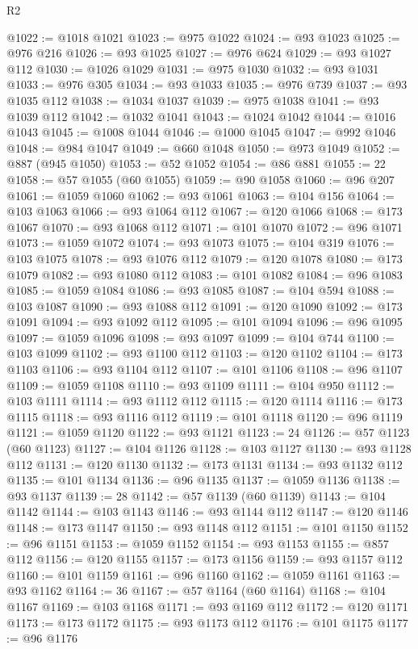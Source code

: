 \begin{lexlean}{R2}
\begin{coremodule}
@1022 := @1018 @1021
@1023 := @975 @1022
@1024 := @93 @1023
@1025 := @976 @216
@1026 := @93 @1025
@1027 := @976 @624
@1029 := @93 @1027 @112
@1030 := @1026 @1029
@1031 := @975 @1030
@1032 := @93 @1031
@1033 := @976 @305
@1034 := @93 @1033
@1035 := @976 @739
@1037 := @93 @1035 @112
@1038 := @1034 @1037
@1039 := @975 @1038
@1041 := @93 @1039 @112
@1042 := @1032 @1041
@1043 := @1024 @1042
@1044 := @1016 @1043
@1045 := @1008 @1044
@1046 := @1000 @1045
@1047 := @992 @1046
@1048 := @984 @1047
@1049 := @660 @1048
@1050 := @973 @1049
@1052 := @887 (@945 @1050)
@1053 := @52 @1052
@1054 := @86 @881
@1055 := 22
@1058 := @57 @1055 (@60 @1055)
@1059 := @90 @1058
@1060 := @96 @207
@1061 := @1059 @1060
@1062 := @93 @1061
@1063 := @104 @156
@1064 := @103 @1063
@1066 := @93 @1064 @112
@1067 := @120 @1066
@1068 := @173 @1067
@1070 := @93 @1068 @112
@1071 := @101 @1070
@1072 := @96 @1071
@1073 := @1059 @1072
@1074 := @93 @1073
@1075 := @104 @319
@1076 := @103 @1075
@1078 := @93 @1076 @112
@1079 := @120 @1078
@1080 := @173 @1079
@1082 := @93 @1080 @112
@1083 := @101 @1082
@1084 := @96 @1083
@1085 := @1059 @1084
@1086 := @93 @1085
@1087 := @104 @594
@1088 := @103 @1087
@1090 := @93 @1088 @112
@1091 := @120 @1090
@1092 := @173 @1091
@1094 := @93 @1092 @112
@1095 := @101 @1094
@1096 := @96 @1095
@1097 := @1059 @1096
@1098 := @93 @1097
@1099 := @104 @744
@1100 := @103 @1099
@1102 := @93 @1100 @112
@1103 := @120 @1102
@1104 := @173 @1103
@1106 := @93 @1104 @112
@1107 := @101 @1106
@1108 := @96 @1107
@1109 := @1059 @1108
@1110 := @93 @1109
@1111 := @104 @950
@1112 := @103 @1111
@1114 := @93 @1112 @112
@1115 := @120 @1114
@1116 := @173 @1115
@1118 := @93 @1116 @112
@1119 := @101 @1118
@1120 := @96 @1119
@1121 := @1059 @1120
@1122 := @93 @1121
@1123 := 24
@1126 := @57 @1123 (@60 @1123)
@1127 := @104 @1126
@1128 := @103 @1127
@1130 := @93 @1128 @112
@1131 := @120 @1130
@1132 := @173 @1131
@1134 := @93 @1132 @112
@1135 := @101 @1134
@1136 := @96 @1135
@1137 := @1059 @1136
@1138 := @93 @1137
@1139 := 28
@1142 := @57 @1139 (@60 @1139)
@1143 := @104 @1142
@1144 := @103 @1143
@1146 := @93 @1144 @112
@1147 := @120 @1146
@1148 := @173 @1147
@1150 := @93 @1148 @112
@1151 := @101 @1150
@1152 := @96 @1151
@1153 := @1059 @1152
@1154 := @93 @1153
@1155 := @857 @112
@1156 := @120 @1155
@1157 := @173 @1156
@1159 := @93 @1157 @112
@1160 := @101 @1159
@1161 := @96 @1160
@1162 := @1059 @1161
@1163 := @93 @1162
@1164 := 36
@1167 := @57 @1164 (@60 @1164)
@1168 := @104 @1167
@1169 := @103 @1168
@1171 := @93 @1169 @112
@1172 := @120 @1171
@1173 := @173 @1172
@1175 := @93 @1173 @112
@1176 := @101 @1175
@1177 := @96 @1176

\end{coremodule}
\end{lexlean}
